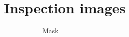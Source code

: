 \section{Inspection images}\label{ap:inspec_img}
\begin{figure}[!t]	
    \centering
    \begin{subfigure}[t]{0.24\linewidth}
    	\centering
 	\caption{Mask}
 	\label{fig:TS_05_20_13_50_44}
 \end{subfigure}
    \hfill
    \begin{subfigure}[t]{0.24\linewidth}
 	\centering

\end{subfigure}
\end{figure}
